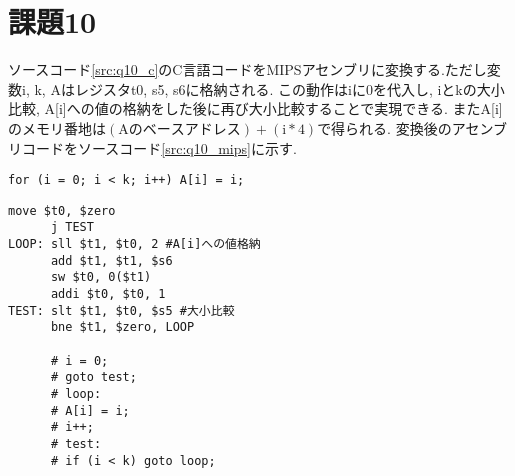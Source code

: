 \section{課題10}
ソースコード\ref{src:q10_c}のC言語コードをMIPSアセンブリに変換する.ただし変数i, k, Aはレジスタt0, s5, s6に格納される.
この動作はiに0を代入し, iとkの大小比較, A[i]への値の格納をした後に再び大小比較することで実現できる.
またA[i]のメモリ番地は$(\mathrm{A}のベースアドレス)+(\mathrm{i}*4)$で得られる.
変換後のアセンブリコードをソースコード\ref{src:q10_mips}に示す.
\begin{lstlisting}[caption=C言語コード,label=src:q10_c]
for (i = 0; i < k; i++) A[i] = i;
\end{lstlisting}
\begin{lstlisting}[caption=MIPSアセンブリコード, label=src:q10_mips]
      move $t0, $zero
      j TEST
LOOP: sll $t1, $t0, 2 #A[i]への値格納
      add $t1, $t1, $s6
      sw $t0, 0($t1)
      addi $t0, $t0, 1
TEST: slt $t1, $t0, $s5 #大小比較
      bne $t1, $zero, LOOP

      # i = 0;
      # goto test;
      # loop:
      # A[i] = i;
      # i++;
      # test:
      # if (i < k) goto loop;
\end{lstlisting}